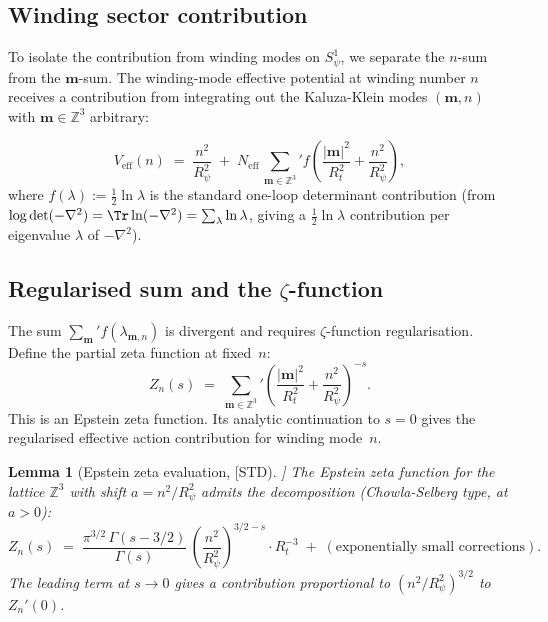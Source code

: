 \documentclass[12pt,a4paper]{article}
\newtheorem{lemma}[theorem]{Lemma}
\theoremstyle{definition}
\theoremstyle{remark}
\newcommand{\ZZ}{\mathbb{Z}}
\begin{document}
\subsection{Winding sector contribution}

To isolate the contribution from winding modes on $S^1_\psi$, we separate
the $n$-sum from the $\mathbf{m}$-sum.  The winding-mode effective potential
at winding number $n$ receives a contribution from integrating out the
Kaluza-Klein modes $(\mathbf{m}, n)$ with $\mathbf{m} \in \ZZ^3$ arbitrary:

\begin{equation}
\label{eq:Vwind}
  V_{\mathrm{eff}}(n)
  \;=\;
  \frac{n^2}{R_\psi^2}
  \;+\;
  N_{\mathrm{eff}}\,\sum_{\mathbf{m}\in\ZZ^3}'
  f\!\left(\frac{|\mathbf{m}|^2}{R_t^2} + \frac{n^2}{R_\psi^2}\right),
\end{equation}
where $f(\lambda) := \frac{1}{2}\ln\lambda$ is the standard one-loop determinant
contribution (from $\log\det(-\nabla^2) = \Tr\ln(-\nabla^2) = \sum_\lambda \ln\lambda$,
giving a $\frac{1}{2}\ln\lambda$ contribution per eigenvalue $\lambda$ of $-\nabla^2$).

\subsection{Regularised sum and the $\zeta$-function}

The sum $\sum_{\mathbf{m}}' f(\lambda_{\mathbf{m},n})$ is divergent and
requires $\zeta$-function regularisation.  Define the partial zeta function
at fixed~$n$:
\begin{equation}
\label{eq:zetaR}
  Z_n(s)
  \;=\;
  \sum_{\mathbf{m}\in\ZZ^3}'
  \left(\frac{|\mathbf{m}|^2}{R_t^2} + \frac{n^2}{R_\psi^2}\right)^{-s}.
\end{equation}
This is an Epstein zeta function.  Its analytic continuation to $s = 0$
gives the regularised effective action contribution for winding mode~$n$.

\begin{lemma}[Epstein zeta evaluation, [STD]]
\label{lem:epstein}
The Epstein zeta function for the lattice $\ZZ^3$ with shift $a = n^2/R_\psi^2$
admits the decomposition (Chowla-Selberg type, at $a > 0$):
\begin{equation}
\label{eq:chowla}
  Z_n(s)
  \;=\;
  \frac{\pi^{3/2}\,\Gamma(s-3/2)}{\Gamma(s)}\,
  \left(\frac{n^2}{R_\psi^2}\right)^{3/2-s}
  \cdot R_t^{-3}
  \;+\;
  (\text{exponentially small corrections}).
\end{equation}
The leading term at $s \to 0$ gives a contribution proportional to
$(n^2/R_\psi^2)^{3/2}$ to $Z_n'(0)$.
\end{lemma}
\end{document}
